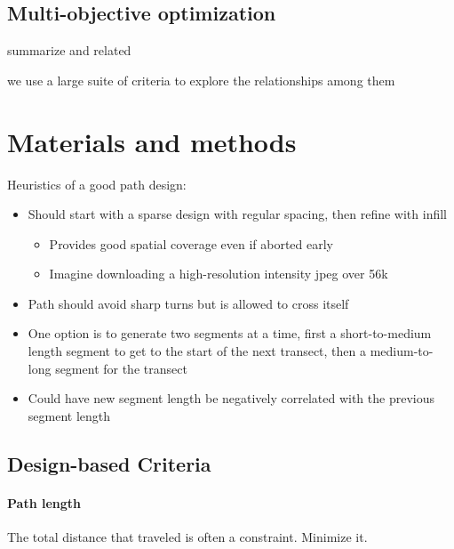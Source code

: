 \documentclass[review]{elsarticle}
\begin{document}
\subsection{Multi-objective optimization}

summarize \citet{lark} and related

we use a large suite of criteria to explore the relationships among them


\section{Materials and methods}

Heuristics of a good path design:
\begin{itemize}
\item Should start with a sparse design with regular spacing, then refine with
infill
\begin{itemize}
\item Provides good spatial coverage even if aborted early
\item Imagine downloading a high-resolution intensity jpeg over 56k
\end{itemize}
\item Path should avoid sharp turns but is allowed to cross itself
\item One option is to generate two segments at a time, first a short-to-medium
length segment to get to the start of the next transect, then a  medium-to-long
segment for the transect
\item Could have new segment length be negatively correlated with the previous
segment length
\end{itemize}


\subsection{Design-based Criteria}

\paragraph{Path length}
The total distance that traveled is often a constraint. Minimize it.
\end{document}
